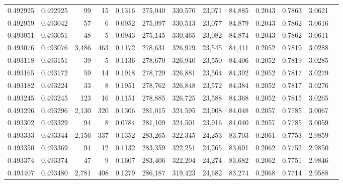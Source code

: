 \begin{tabular}{rrrrrrrrrrrrr}
0.492925 & 0.492925 &    99 &    15 &                                     0.1316 & 275,040 & 330,570 &  23,071 &  84,885 & 0.2043 & 0.7863 & 3.0621 \\
0.492959 & 0.493042 &    57 &     6 &                                     0.0952 & 275,097 & 330,513 &  23,077 &  84,879 & 0.2043 & 0.7862 & 3.0616 \\
0.493051 & 0.493051 &    48 &     5 &                                     0.0943 & 275,145 & 330,465 &  23,082 &  84,874 & 0.2043 & 0.7862 & 3.0611 \\
0.493076 & 0.493076 & 3,486 &   463 &                                     0.1172 & 278,631 & 326,979 &  23,545 &  84,411 & 0.2052 & 0.7819 & 3.0288 \\
0.493118 & 0.493151 &    39 &     5 &                                     0.1136 & 278,670 & 326,940 &  23,550 &  84,406 & 0.2052 & 0.7819 & 3.0285 \\
0.493165 & 0.493172 &    59 &    14 &                                     0.1918 & 278,729 & 326,881 &  23,564 &  84,392 & 0.2052 & 0.7817 & 3.0279 \\
0.493182 & 0.493224 &    33 &     8 &                                     0.1951 & 278,762 & 326,848 &  23,572 &  84,384 & 0.2052 & 0.7817 & 3.0276 \\
0.493245 & 0.493245 &   123 &    16 &                                     0.1151 & 278,885 & 326,725 &  23,588 &  84,368 & 0.2052 & 0.7815 & 3.0265 \\
0.493296 & 0.493296 & 2,130 &   320 &                                     0.1306 & 281,015 & 324,595 &  23,908 &  84,048 & 0.2057 & 0.7785 & 3.0067 \\
0.493302 & 0.493329 &    94 &     8 &                                     0.0784 & 281,109 & 324,501 &  23,916 &  84,040 & 0.2057 & 0.7785 & 3.0059 \\
0.493333 & 0.493344 & 2,156 &   337 &                                     0.1352 & 283,265 & 322,345 &  24,253 &  83,703 & 0.2061 & 0.7753 & 2.9859 \\
0.493350 & 0.493369 &    94 &    12 &                                     0.1132 & 283,359 & 322,251 &  24,265 &  83,691 & 0.2062 & 0.7752 & 2.9850 \\
0.493374 & 0.493374 &    47 &     9 &                                     0.1607 & 283,406 & 322,204 &  24,274 &  83,682 & 0.2062 & 0.7751 & 2.9846 \\
0.493407 & 0.493480 & 2,781 &   408 &                                     0.1279 & 286,187 & 319,423 &  24,682 &  83,274 & 0.2068 & 0.7714 & 2.9588 \\

\end{tabular}
